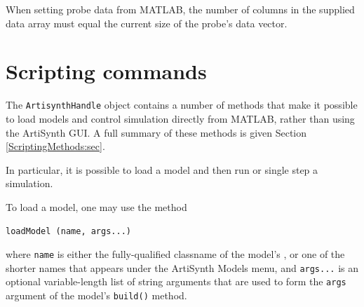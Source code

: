 \documentclass{article}
\begin{document}
\begin{sideblock}
When setting probe data from MATLAB, the number of columns in the
supplied data array must equal the current size of the probe's data
vector.
\end{sideblock}

\section{Scripting commands}
\label{MatlabScripting:sec}

The {\tt ArtisynthHandle} object contains a number of methods that
make it possible to load models and control simulation directly from
MATLAB, rather than using the ArtiSynth GUI. A full summary of these
methods is given Section \ref{ScriptingMethods:sec}.

In particular, it is possible to load a model and then run or single
step a simulation.

To load a model, one may use the method
%
\begin{lstlisting}[]
  loadModel (name, args...)
\end{lstlisting}
%
where {\tt name} is either the fully-qualified classname of the
model's 
,
or one of the shorter names that appears
under the ArtiSynth {\sf Models} menu, and {\tt args...} is an
optional variable-length list of string arguments that are used to
form the {\tt args} argument of the model's {\tt build()} method.
\end{document}
